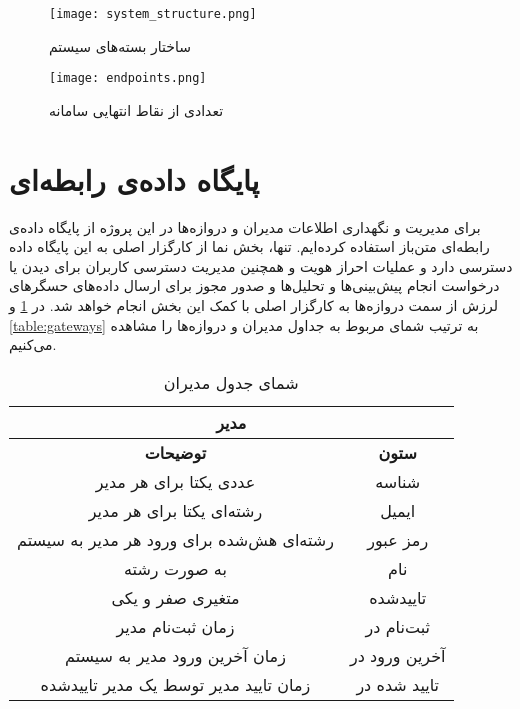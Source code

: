 \begin{figure}[!h]
\centerline{\texttt{[image: system\_structure.png]}}
\caption{ساختار بسته‌های سیستم}
\label{fig:system_structure}
\end{figure}

\begin{figure}[!h]
\centerline{\texttt{[image: endpoints.png]}}
\caption{تعدادی از نقاط انتهایی سامانه}
\label{fig:endpoints}
\end{figure}


\section{پایگاه داده‌ی رابطه‌ای}
برای مدیریت و نگهداری اطلاعات مدیران و دروازه‌ها در این پروژه از پایگاه داده‌ی رابطه‌ای متن‌باز  استفاده کرده‌ایم. تنها، بخش نما از کارگزار اصلی به این پایگاه داده دسترسی دارد و عملیات احراز هویت و همچنین مدیریت دسترسی کاربران برای دیدن یا درخواست انجام پیش‌بینی‌ها و تحلیل‌ها و صدور مجوز برای ارسال داده‌های حسگرهای لرزش از سمت دروازه‌ها به کارگزار اصلی با کمک این بخش انجام خواهد شد. در \cref{table:admins} و \cref{table:gateways} به ترتیب شمای مربوط به جداول مدیران و دروازه‌ها را مشاهده می‌کنیم.

\begin{table}[h!]
  \begin{center}
    \caption{شمای جدول مدیران}
    \label{table:admins}
    \begin{tabular}{|c|c|} %
    	\hline
\multicolumn{2}{|c|}{\textbf{مدیر}}\\ \hline\hline
\textbf{توضیحات} & \textbf{ستون}\\
    	\hline
	عددی یکتا برای هر مدیر & شناسه\\
    	\hline
	رشته‌ای یکتا برای هر مدیر & ایمیل\\
    	\hline
رشته‌ای هش‌شده برای ورود هر مدیر به سیستم & رمز عبور\\
    	\hline
به صورت رشته & نام\\
    	\hline
متغیری صفر و یکی & تایید‌شده\\
    	\hline
زمان ثبت‌نام مدیر & ثبت‌نام در\\
    	\hline
زمان آخرین ورود مدیر به سیستم & آخرین ورود در\\
    	\hline
زمان تایید مدیر توسط یک مدیر تایید‌شده & تایید شده در\\
    	\hline
    \end{tabular}
  \end{center}
\end{table} 

